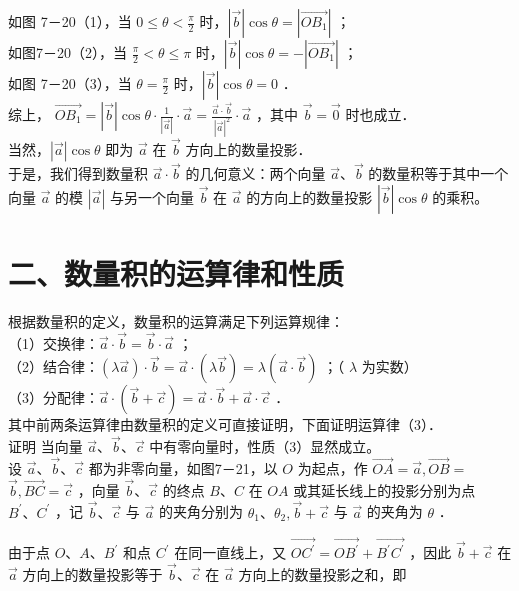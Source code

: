 \documentclass[10pt]{article}
\begin{document}
如图 7－20（1），当 \(0 \leqslant \theta<\frac{\pi}{2}\) 时，\(|\vec{b}| \cos \theta=\left|\overrightarrow{O B_{1}}\right|\) ；\\
如图7－20（2），当 \(\frac{\pi}{2}<\theta \leqslant \pi\) 时，\(|\vec{b}| \cos \theta=-\left|\overrightarrow{O B_{1}}\right|\) ；\\
如图 7－20（3），当 \(\theta=\frac{\pi}{2}\) 时，\(|\vec{b}| \cos \theta=0\) ．\\
综上， \(\overrightarrow{O B_{1}}=|\vec{b}| \cos \theta \cdot \frac{1}{|\vec{a}|} \cdot \vec{a}=\frac{\vec{a} \cdot \vec{b}}{|\vec{a}|^{2}} \cdot \vec{a}\) ，其中 \(\vec{b}=\overrightarrow{0}\) 时也成立．\\
当然，\(|\vec{a}| \cos \theta\) 即为 \(\vec{a}\) 在 \(\vec{b}\) 方向上的数量投影．\\
于是，我们得到数量积 \(\vec{a} \cdot \vec{b}\) 的几何意义：两个向量 \(\vec{a} 、 \vec{b}\) 的数量积等于其中一个向量 \(\vec{a}\) 的模 \(|\vec{a}|\) 与另一个向量 \(\vec{b}\) 在 \(\vec{a}\) 的方向上的数量投影 \(|\vec{b}| \cos \theta\) 的乘积。

\section*{二、数量积的运算律和性质}
根据数量积的定义，数量积的运算满足下列运算规律：\\
（1）交换律：\(\vec{a} \cdot \vec{b}=\vec{b} \cdot \vec{a}\) ；\\
（2）结合律：\((\lambda \vec{a}) \cdot \vec{b}=\vec{a} \cdot(\lambda \vec{b})=\lambda(\vec{a} \cdot \vec{b})\) ；（ \(\lambda\) 为实数）\\
（3）分配律：\(\vec{a} \cdot(\vec{b}+\vec{c})=\vec{a} \cdot \vec{b}+\vec{a} \cdot \vec{c}\) ．\\
其中前两条运算律由数量积的定义可直接证明，下面证明运算律（3）．\\
证明 当向量 \(\vec{a} 、 \vec{b} 、 \vec{c}\) 中有零向量时，性质（3）显然成立。\\
设 \(\vec{a} 、 \vec{b} 、 \vec{c}\) 都为非零向量，如图7－21，以 \(O\) 为起点，作 \(\overrightarrow{O A}=\vec{a}, \overrightarrow{O B}=\) \(\vec{b}, \overrightarrow{B C}=\vec{c}\) ，向量 \(\vec{b} 、 \vec{c}\) 的终点 \(B 、 C\) 在 \(O A\) 或其延长线上的投影分别为点 \(B^{\prime} 、 C^{\prime}\) ，记 \(\vec{b} 、 \vec{c}\) 与 \(\vec{a}\) 的夹角分别为 \(\theta_{1} 、 \theta_{2}, \vec{b}+\vec{c}\) 与 \(\vec{a}\) 的夹角为 \(\theta\) ．

由于点 \(O 、 A 、 B^{\prime}\) 和点 \(C^{\prime}\) 在同一直线上，又 \(\overrightarrow{O C^{\prime}}=\overrightarrow{O B^{\prime}}+\overrightarrow{B^{\prime} C^{\prime}}\) ，因此 \(\vec{b}+\vec{c}\) 在 \(\vec{a}\) 方向上的数量投影等于 \(\vec{b} 、 \vec{c}\) 在 \(\vec{a}\) 方向上的数量投影之和，即
\end{document}
